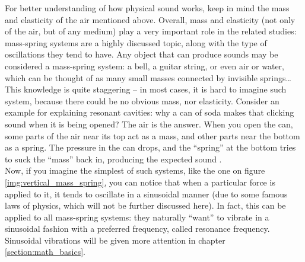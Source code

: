 For better understanding of how physical sound works, keep in mind the mass and elasticity of the air mentioned above. Overall, mass and elasticity (not only of the air, but of any medium) play a very important role in the related studies: mass-spring systems are a highly discussed topic, along with the type of oscillations they tend to have. Any object that can produce sounds may be considered a mass-spring system: a bell, a guitar string, or even air or water, which can be thought of as many small masses connected by invisible springs\dots{} This knowledge is quite staggering -- in most cases, it is hard to imagine such system, because there could be no obvious mass, nor elasticity. Consider an example for explaining resonant cavities: why a can of soda makes that clicking sound when it is being opened? The air is the answer. When you open the can, some parts of the air near its top act as a mass, and other parts near the bottom as a spring. The pressure in the can drops, and the “spring” at the bottom tries to suck the “mass” back in, producing the expected sound \cite{Schnupp2011}.\\

Now, if you imagine the simplest of such systems, like the one on figure \ref{img:vertical_mass_spring}, you can notice that when a particular force is applied to it, it tends to oscillate in a sinusoidal manner (due to some famous laws of physics, which will not be further discussed here). In fact, this can be applied to all mass-spring systems: they naturally “want” to vibrate in a sinusoidal fashion with a preferred frequency, called resonance frequency. Sinusoidal vibrations will be given more attention in chapter \ref{section:math_basics}.\\

